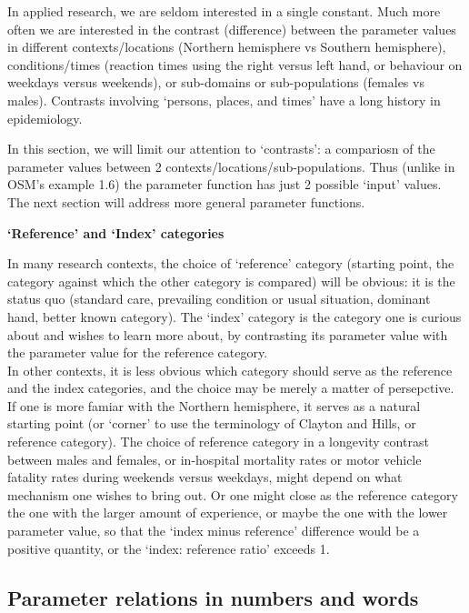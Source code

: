 \documentclass[]{book}
\begin{document}
In applied research, we are seldom interested in a single constant. Much more often we are interested in the contrast (difference) between the parameter values in different contexts/locations (Northern hemisphere vs Southern hemisphere), conditions/times (reaction times using the right versus left hand, or behaviour on weekdays versus weekends), or sub-domains or sub-populations (females vs males). Contrasts involving `persons, places, and times' have a long history in epidemiology.

In this section, we will limit our attention to `contrasts': a compariosn of the parameter values between 2 contexts/locations/sub-populations. Thus (unlike in OSM's example 1.6) the parameter function has just 2 possible `input' values. The next section will address more general parameter functions.

\textbf{`Reference' and `Index' categories}

In many research contexts, the choice of `reference' category (starting point, the category against which the other category is compared) will be obvious: it is the status quo (standard care, prevailing condition or usual situation, dominant hand, better known category). The `index' category is the category one is curious about and wishes to learn more about, by contrasting its parameter value with the parameter value for the reference category.\\
\hspace*{0.333em}\hspace*{0.333em}\hspace*{0.333em}\hspace*{0.333em}In other contexts, it is less obvious which category should serve as the reference and the index categories, and the choice may be merely a matter of persepctive. If one is more famiar with the Northern hemisphere, it serves as a natural starting point (or `corner' to use the terminology of Clayton and Hills, or reference category). The choice of reference category in a longevity contrast between males and females, or in-hospital mortality rates or motor vehicle fatality rates during weekends versus weekdays, might depend on what mechanism one wishes to bring out. Or one might close as the reference category the one with the larger amount of experience, or maybe the one with the lower parameter value, so that the `index minus reference' difference would be a positive quantity, or the `index: reference ratio' exceeds 1.

\hypertarget{parameter-relations-in-numbers-and-words-1}{%
\subsection{Parameter relations in numbers and words}\label{parameter-relations-in-numbers-and-words-1}}
\end{document}
